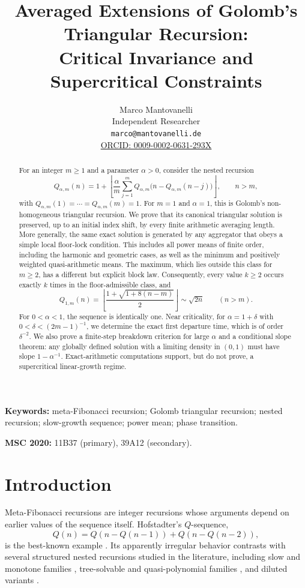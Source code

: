 \documentclass[11pt]{article}
\title{Averaged Extensions of Golomb's Triangular Recursion:\\
Critical Invariance and Supercritical Constraints}
\author{
Marco Mantovanelli\\
Independent Researcher\\[1mm]
\texttt{marco@mantovanelli.de}\\[1mm]
\href{https://orcid.org/0009-0002-0631-293X}{ORCID: 0009-0002-0631-293X}
}
\date{}
\theoremstyle{definition}
\theoremstyle{remark}
\newcommand{\floor}[1]{\left\lfloor #1\right\rfloor}
\begin{document}
\maketitle

\begin{abstract}
For an integer $m\ge 1$ and a parameter $\alpha>0$, consider the nested
recursion
\[
Q_{\alpha,m}(n)
=
1+\floor{
\frac{\alpha}{m}\sum_{j=1}^{m}
Q_{\alpha,m}\bigl(n-Q_{\alpha,m}(n-j)\bigr)
},
\qquad n>m,
\]
with $Q_{\alpha,m}(1)=\cdots=Q_{\alpha,m}(m)=1$.
For $m=1$ and $\alpha=1$, this is Golomb's non-homogeneous triangular
recursion.  We prove that its canonical triangular solution is preserved,
up to an initial index shift, by every finite arithmetic averaging length.
More generally, the same exact solution is generated by any aggregator that
obeys a simple local floor-lock condition.  This includes all power means of
finite order, including the harmonic and geometric cases, as well as the
minimum and positively weighted quasi-arithmetic means.  The maximum, which
lies outside this class for $m\ge2$, has a different but explicit block law.
Consequently, every value $k\ge2$ occurs
exactly $k$ times in the floor-admissible class, and
\[
Q_{1,m}(n)
=
\floor{\frac{1+\sqrt{1+8(n-m)}}{2}}
\sim \sqrt{2n}
\qquad(n>m).
\]
For $0<\alpha<1$, the sequence is identically one.  Near criticality, for
$\alpha=1+\delta$ with $0<\delta<(2m-1)^{-1}$, we determine the exact first
departure time, which is of order $\delta^{-2}$.  We also prove a finite-step
breakdown criterion for large $\alpha$ and a conditional slope theorem:
any globally defined solution with a limiting density in $(0,1)$ must have
slope $1-\alpha^{-1}$.  Exact-arithmetic computations support, but do not
prove, a supercritical linear-growth regime.
\end{abstract}

\medskip
\noindent\textbf{Keywords:}
meta-Fibonacci recursion; Golomb triangular recursion; nested recursion;
slow-growth sequence; power mean; phase transition.

\medskip
\noindent\textbf{MSC 2020:}
11B37 (primary), 39A12 (secondary).

\section{Introduction}

Meta-Fibonacci recursions are integer recursions whose arguments depend on
earlier values of the sequence itself.  Hofstadter's $Q$-sequence,
\[
Q(n)=Q(n-Q(n-1))+Q(n-Q(n-2)),
\]
is the best-known example \cite{hofstadter}.  Its apparently irregular
behavior contrasts with several structured nested recursions studied in the
literature, including slow and monotone families
\cite{tanny,higham-tanny,balamohan-kuznetsov-tanny,callaghan-chew-tanny},
tree-solvable and quasi-polynomial families
\cite{isgur-kuznetsov-tanny,celaya-ruskey,fox,fox-symbolic}, and diluted
variants \cite{deane-gentile,deane-gentile-subsets}.
\end{document}
